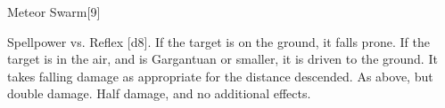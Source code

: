 \begin{spellsection}{Meteor Swarm}[9]
    \begin{spellheader}
    \end{spellheader}
    \begin{spellcontent}
        \begin{spelltargetinginfo}
            \spellrng{\rngmed}
        \end{spelltargetinginfo}
        \begin{spelleffects}
            \begin{spellattack}{Spellpower vs. Reflex}
                \spellsuccess {}[d8].
                If the target is on the ground, it falls prone. If the target is in the air, and is Gargantuan or smaller, it is driven to the ground. It takes falling damage as appropriate for the distance descended.
                \spellcritical As above, but double damage.
                \spellfailure Half damage, and no additional effects.
            \end{spellattack}
        \end{spelleffects}
    \end{spellcontent}
    \begin{spellfooter}
        \spellnotes \firespellnotes

        \destructivespellnotes
        \miscastyou
    \end{spellfooter}
\end{spellsection}

